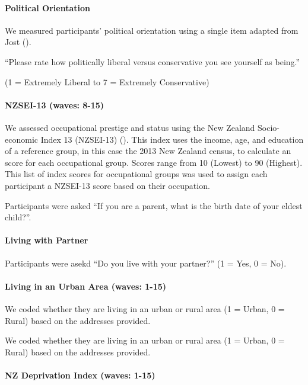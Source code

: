 \documentclass[
  singlecolumn,
  9pt]{article}
\let\oldparagraph\paragraph
\renewcommand{\paragraph}[1]{\oldparagraph{#1}\mbox{}}
\begin{document}
\paragraph{Political Orientation}\label{political-orientation}

We measured participants' political orientation using a single item
adapted from Jost ().

``Please rate how politically liberal versus conservative you see
yourself as being.''

(1 = Extremely Liberal to 7 = Extremely Conservative)

\paragraph{NZSEI-13 (waves: 8-15)}\label{nzsei-13-waves-8-15}

We assessed occupational prestige and status using the New Zealand
Socio-economic Index 13 (NZSEI-13) (). This index uses the income, age, and education of
a reference group, in this case the 2013 New Zealand census, to
calculate an score for each occupational group. Scores range from 10
(Lowest) to 90 (Highest). This list of index scores for occupational
groups was used to assign each participant a NZSEI-13 score based on
their occupation.

Participants were asked ``If you are a parent, what is the birth date of
your eldest child?''.

\paragraph{Living with Partner}\label{living-with-partner}

Participants were asekd ``Do you live with your partner?'' (1 = Yes, 0 =
No).

\paragraph{Living in an Urban Area (waves:
1-15)}\label{living-in-an-urban-area-waves-1-15}

We coded whether they are living in an urban or rural area (1 = Urban, 0
= Rural) based on the addresses provided.

We coded whether they are living in an urban or rural area (1 = Urban, 0
= Rural) based on the addresses provided.

\paragraph{NZ Deprivation Index (waves:
1-15)}\label{nz-deprivation-index-waves-1-15}
\end{document}
